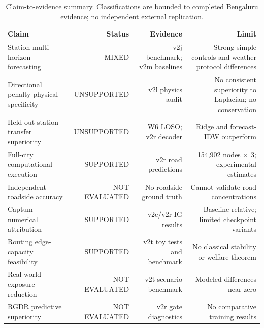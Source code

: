 \begin{table}[t]
\centering
\footnotesize
\caption{Claim-to-evidence summary. Classifications are bounded to completed Bengaluru evidence; no independent external replication.}
\label{tab:t08}
\begin{tabular}{lrrr}
\hline
Claim & Status & Evidence & Limit \\
\hline
Station multi-horizon forecasting & MIXED & v2j benchmark; v2m baselines & Strong simple controls and weather protocol differences \\
Directional penalty physical specificity & UNSUPPORTED & v2l physics audit & No consistent superiority to Laplacian; no conservation \\
Held-out station transfer superiority & UNSUPPORTED & W6 LOSO; v2r decoder & Ridge and forecast-IDW outperform \\
Full-city computational execution & SUPPORTED & v2r road predictions & 154,902 nodes × 3; experimental estimates \\
Independent roadside accuracy & NOT EVALUATED & No roadside ground truth & Cannot validate road concentrations \\
Captum numerical attribution & SUPPORTED & v2c/v2r IG results & Baseline-relative; limited checkpoint variants \\
Routing edge-capacity feasibility & SUPPORTED & v2t toy tests and benchmark & No classical stability or welfare theorem \\
Real-world exposure reduction & NOT EVALUATED & v2t scenario benchmark & Modeled differences near zero \\
RGDR predictive superiority & NOT EVALUATED & v2r gate diagnostics & No comparative training results \\
\hline
\end{tabular}
\end{table}
